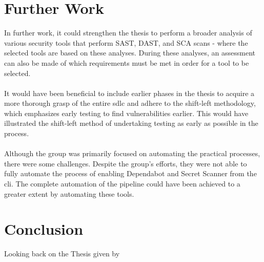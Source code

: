 \section{Further Work}
In further work, it could strengthen the thesis to perform a broader analysis of various security tools that perform SAST, DAST, and SCA scans -  where the selected tools are based on these analyses. During these analyses, an assessment can also be made of which requirements must be met in order for a tool to be selected. 
\\~\\
It would have been beneficial to include earlier phases in the thesis to acquire a more thorough grasp of the entire \acrlong{sdlc} and adhere to the shift-left methodology, which emphasizes early testing to find vulnerabilities earlier. This would have illustrated the shift-left method of undertaking testing as early as possible in the process.  
\\~\\
Although the group was primarily focused on automating the practical processes, there were some challenges. Despite the group's efforts, they were not able to fully automate the process of enabling Dependabot and Secret Scanner from the \acrshort{cli}. The complete automation of the pipeline could have been achieved to a greater extent by automating these tools. 

\section{Conclusion}
Looking back on the Thesis given by 
